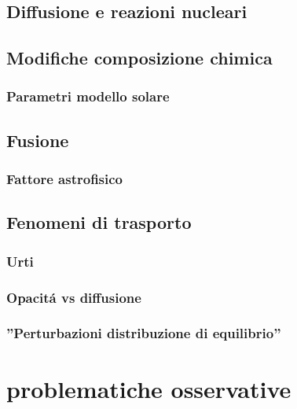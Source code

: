 \documentclass[../main.tex]{subfiles}
\begin{document}
\begin{refsection}

\chapter{Diffusione e reazioni nucleari}

\printbibliography

\section{Modifiche composizione chimica}

\subsection{Parametri modello solare}

\section{Fusione}

\subsection{Fattore astrofisico}

\section{Fenomeni di trasporto}

\subsection{Urti}

\subsection{Opacit\'a vs diffusione}

\subsection{''Perturbazioni distribuzione di equilibrio''}

\end{refsection}

\chapter{problematiche osservative}
\end{document}
